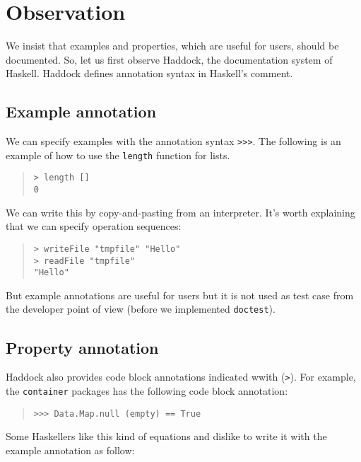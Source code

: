 \documentclass[preprint]{sigplanconf}
\begin{document}
\section{Observation}

We insist that examples and properties, which are useful for users, should be
documented.
So, let us first observe Haddock, the documentation system of Haskell. Haddock defines annotation syntax in Haskell's comment.

\subsection{Example annotation}

We can specify examples with the annotation syntax {\tt >>>}.
The following is an example of how to use the {\tt length} function
for lists.

\begin{quote}
\begin{verbatim}
> length []
0
\end{verbatim}
\end{quote}

\noindent We can write this by copy-and-pasting from an interpreter.
It's worth explaining that we can specify operation sequences:

\begin{quote}
\begin{verbatim}
> writeFile "tmpfile" "Hello"
> readFile "tmpfile"
"Hello"
\end{verbatim}
\end{quote}

\noindent But example annotations are useful for users but 
it is not used as test case from the developer point of view (before we implemented {\tt doctest}).

\subsection{Property annotation}

Haddock also provides code block annotations indicated wwith ({\tt >}).
For example, the {\tt container} packages has the following code block annotation:

\begin{quote}
\begin{verbatim}
>>> Data.Map.null (empty) == True
\end{verbatim}
\end{quote}

\noindent Some Haskellers like this kind of equations and dislike to write it with the example annotation as follow:
\end{document}
